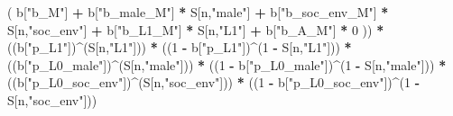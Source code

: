 \documentclass[
]{book}
\newenvironment{Shaded}{\begin{snugshade}}{\end{snugshade}}
\newcommand{\DecValTok}[1]{\textcolor[rgb]{0.00,0.00,0.81}{#1}}
\newcommand{\NormalTok}[1]{#1}
\newcommand{\SpecialCharTok}[1]{\textcolor[rgb]{0.81,0.36,0.00}{\textbf{#1}}}
\newcommand{\StringTok}[1]{\textcolor[rgb]{0.31,0.60,0.02}{#1}}
\begin{document}
\begin{Shaded}
\begin{Highlighting}[]
\NormalTok{          ( b[}\StringTok{"b\_M"}\NormalTok{] }\SpecialCharTok{+} 
\NormalTok{              b[}\StringTok{"b\_male\_M"}\NormalTok{] }\SpecialCharTok{*}\NormalTok{ S[n,}\StringTok{"male"}\NormalTok{] }\SpecialCharTok{+} 
\NormalTok{              b[}\StringTok{"b\_soc\_env\_M"}\NormalTok{] }\SpecialCharTok{*}\NormalTok{ S[n,}\StringTok{"soc\_env"}\NormalTok{] }\SpecialCharTok{+} 
\NormalTok{              b[}\StringTok{"b\_L1\_M"}\NormalTok{] }\SpecialCharTok{*}\NormalTok{ S[n,}\StringTok{"L1"}\NormalTok{] }\SpecialCharTok{+}
\NormalTok{              b[}\StringTok{"b\_A\_M"}\NormalTok{] }\SpecialCharTok{*} \DecValTok{0}\NormalTok{ )) }\SpecialCharTok{*} 
\NormalTok{      ((b[}\StringTok{"p\_L1"}\NormalTok{])}\SpecialCharTok{\^{}}\NormalTok{(S[n,}\StringTok{"L1"}\NormalTok{])) }\SpecialCharTok{*}
\NormalTok{      ((}\DecValTok{1} \SpecialCharTok{{-}}\NormalTok{ b[}\StringTok{"p\_L1"}\NormalTok{])}\SpecialCharTok{\^{}}\NormalTok{(}\DecValTok{1} \SpecialCharTok{{-}}\NormalTok{ S[n,}\StringTok{"L1"}\NormalTok{])) }\SpecialCharTok{*}
\NormalTok{      ((b[}\StringTok{"p\_L0\_male"}\NormalTok{])}\SpecialCharTok{\^{}}\NormalTok{(S[n,}\StringTok{"male"}\NormalTok{])) }\SpecialCharTok{*} 
\NormalTok{      ((}\DecValTok{1} \SpecialCharTok{{-}}\NormalTok{ b[}\StringTok{"p\_L0\_male"}\NormalTok{])}\SpecialCharTok{\^{}}\NormalTok{(}\DecValTok{1} \SpecialCharTok{{-}}\NormalTok{ S[n,}\StringTok{"male"}\NormalTok{])) }\SpecialCharTok{*} 
\NormalTok{      ((b[}\StringTok{"p\_L0\_soc\_env"}\NormalTok{])}\SpecialCharTok{\^{}}\NormalTok{(S[n,}\StringTok{"soc\_env"}\NormalTok{])) }\SpecialCharTok{*}
\NormalTok{      ((}\DecValTok{1} \SpecialCharTok{{-}}\NormalTok{ b[}\StringTok{"p\_L0\_soc\_env"}\NormalTok{])}\SpecialCharTok{\^{}}\NormalTok{(}\DecValTok{1} \SpecialCharTok{{-}}\NormalTok{ S[n,}\StringTok{"soc\_env"}\NormalTok{])) }
    

\end{Highlighting}
\end{Shaded}
\end{document}
